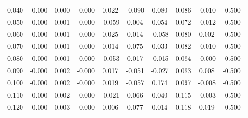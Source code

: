 \documentclass[]{article}
\begin{document}
\begin{table}[H]
\begin{center}
\begin{tabular}{cccccccccc}
				
				\footnotesize 0.040 & \footnotesize -0.000 & \footnotesize 0.000 & \footnotesize -0.000 & \footnotesize 0.022 & \footnotesize -0.090 & \footnotesize 0.080 & \footnotesize 0.086 & \footnotesize -0.010 & \footnotesize -0.500 \\
				
				\footnotesize 0.050 & \footnotesize -0.000 & \footnotesize 0.001 & \footnotesize -0.000 & \footnotesize -0.059 & \footnotesize 0.004 & \footnotesize 0.054 & \footnotesize 0.072 & \footnotesize -0.012 & \footnotesize -0.500 \\
				
				\footnotesize 0.060 & \footnotesize -0.000 & \footnotesize 0.001 & \footnotesize -0.000 & \footnotesize 0.025 & \footnotesize 0.014 & \footnotesize -0.058 & \footnotesize 0.080 & \footnotesize 0.002 & \footnotesize -0.500 \\				
				
				\footnotesize 0.070 & \footnotesize -0.000 & \footnotesize 0.001 & \footnotesize -0.000 & \footnotesize 0.014 & \footnotesize 0.075 & \footnotesize 0.033 & \footnotesize 0.082 & \footnotesize -0.010 & \footnotesize -0.500 \\				
				
				\footnotesize 0.080 & \footnotesize -0.000 & \footnotesize 0.001 & \footnotesize -0.000 & \footnotesize -0.053 & \footnotesize 0.017 & \footnotesize -0.015 & \footnotesize 0.084 & \footnotesize -0.000 & \footnotesize -0.500 \\		
				
				\footnotesize 0.090 & \footnotesize -0.000 & \footnotesize 0.002 & \footnotesize -0.000 & \footnotesize 0.017 & \footnotesize -0.051 & \footnotesize -0.027 & \footnotesize 0.083 & \footnotesize 0.008 & \footnotesize -0.500 \\			
				
				\footnotesize 0.100 & \footnotesize -0.000 & \footnotesize 0.002 & \footnotesize -0.000 & \footnotesize 0.019 & \footnotesize -0.057 & \footnotesize 0.174 & \footnotesize 0.097 & \footnotesize -0.008 & \footnotesize -0.500 \\				
				
				\footnotesize 0.110 & \footnotesize -0.000 & \footnotesize 0.002 & \footnotesize -0.000 & \footnotesize -0.021 & \footnotesize 0.066 & \footnotesize 0.040 & \footnotesize 0.115 & \footnotesize -0.003 & \footnotesize -0.500 \\	
					
				\footnotesize 0.120	& \footnotesize -0.000 & \footnotesize 0.003 & \footnotesize -0.000 & \footnotesize 0.006 & \footnotesize 0.077 & \footnotesize 0.014 & \footnotesize 0.118 & \footnotesize 0.019 & \footnotesize -0.500 \\
				

\end{tabular}
\end{center}
\end{table}
\end{document}
